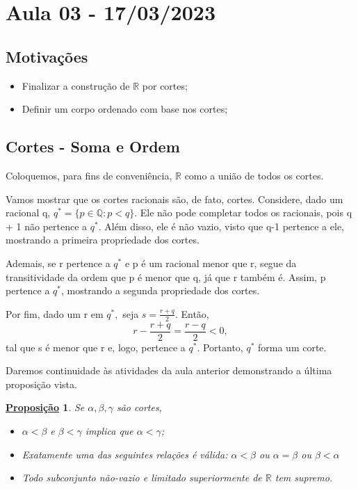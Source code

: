 \documentclass{article}
\newtheorem*{prop*}{\underline{Proposi\c c\~ao}}
\begin{document}
\section{Aula 03 - 17/03/2023}
\subsection{Motiva\c c\~oes}
\begin{itemize}
  \item Finalizar a constru\c c\~ao de $\mathbb{R}$ por cortes;
  \item Definir um corpo ordenado com base nos cortes;
\end{itemize}
\subsection{Cortes - Soma e Ordem}
  Coloquemos, para fins de conveni\^encia, $\mathbb{R}$ como a uni\~ao de todos os cortes.

  Vamos mostrar que os cortes racionais s\~ao, de fato, cortes. Considere, dado um racional q, $q^{*} = \{p\in \mathbb{Q}: p < q\}.$
Ele n\~ao pode completar todos os racionais, pois q + 1 n\~ao pertence a $q^{*}$. Al\'em disso, ele \'e n\~ao vazio, visto que
q-1 pertence a ele, mostrando a primeira propriedade dos cortes. 

  Ademais, se r pertence a $q^{*}$ e p \'e um racional menor que r, segue da transitividade da ordem que p \'e menor que
q, j\'a que r tamb\'em \'e. Assim, p pertence a $q^{*}$, mostrando a segunda propriedade dos cortes. 

  Por fim, dado um r em $q^{*},$ seja $s = \displaystyle \frac{r + q}{2}$. Ent\~ao, 
  $$
    r - \frac{r+q}{2} = \frac{r - q}{2} < 0,
  $$
tal que s \'e menor que r e, logo, pertence a $q^{*}$. Portanto, $q^{*}$ forma um corte.

  Daremos continuidade \`as atividades da aula anterior demonstrando a \'ultima proposi\c c\~ao vista.
\begin{prop*}
  Se $\alpha, \beta, \gamma$ s\~ao cortes,
 \begin{itemize}
   \item[i)] $\alpha < \beta$ e $\beta < \gamma$ implica que $\alpha < \gamma$;
   \item[ii)] Exatamente uma das seguintes rela\c c\~oes \'e v\'alida: $\alpha < \beta$ ou $\alpha = \beta$ ou $\beta < \alpha$
   \item[iii)] Todo subconjunto n\~ao-vazio e limitado superiormente de $\mathbb{R}$ tem supremo.
 \end{itemize}
\end{prop*}
  
\end{document}
